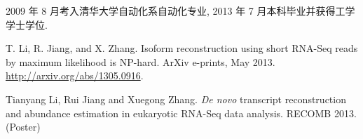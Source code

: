 \begin{resume}


  
  2009 年 8 月考入清华大学自动化系自动化专业, 2013 年 7 月本科毕业并获得工学学士学位. 


  \begin{enumerate}[{[}1{]}]
	\item T. Li, R. Jiang, and X. Zhang. 
	Isoform reconstruction using short RNA-Seq reads by maximum likelihood is NP-hard. 
	ArXiv e-prints, May 2013. \url{http://arxiv.org/abs/1305.0916}.

	
	\item Tianyang Li, Rui Jiang and Xuegong Zhang. 
	\textit{De novo} transcript reconstruction and abundance estimation in eukaryotic RNA-Seq data analysis. 
	RECOMB 2013. (Poster)
  \end{enumerate}
  
\end{resume}
